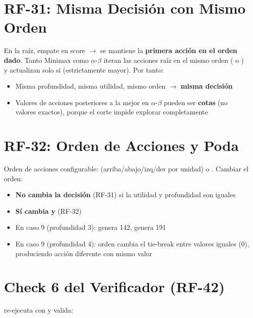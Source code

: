\section{RF-31: Misma Decisión con Mismo Orden}
\label{sec:rf31}

En la raíz, empate en score $\to$ se mantiene la \textbf{primera acción en el orden dado}.
Tanto Minimax como $\alpha$-$\beta$ iteran las acciones raíz en el mismo orden
( o ) y actualizan  solo si 
(estrictamente mayor). Por tanto:

\begin{itemize}
\item Misma profundidad, misma utilidad, mismo orden $\to$ \textbf{misma decisión}
\item Valores de acciones posteriores a la mejor en $\alpha$-$\beta$ pueden ser \textbf{cotas}
  (no valores exactos), porque el corte impide explorar completamente
\end{itemize}

\section{RF-32: Orden de Acciones y Poda}
\label{sec:rf32}

Orden de acciones configurable:  (arriba/abajo/izq/der por unidad) o
. Cambiar el orden:

\begin{itemize}
\item \textbf{No cambia la decisión} (RF-31) si la utilidad y profundidad son iguales
\item \textbf{Sí cambia  y } (RF-32)
\item En caso 9 (profundidad 3):  genera 142,  genera 191
\item En caso 9 (profundidad 4): orden  cambia el tie-break entre valores
  iguales (0), produciendo acción diferente con mismo valor
\end{itemize}

\section{Check 6 del Verificador (RF-42)}
\label{sec:check6}

 re-ejecuta con  y valida:

